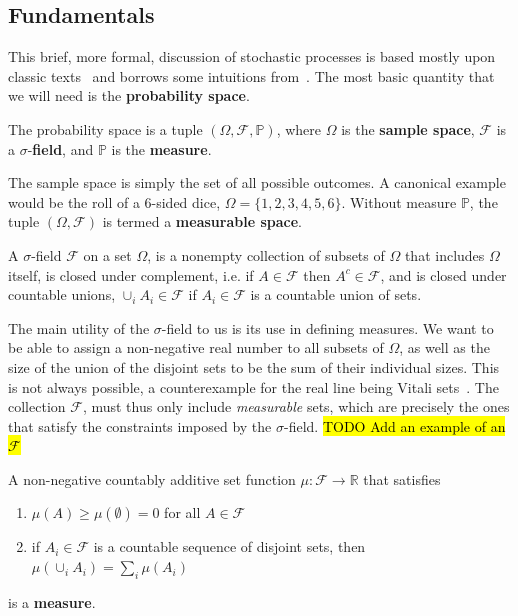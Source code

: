 \subsection{Fundamentals}
This brief, more formal, discussion of stochastic processes is based mostly upon classic texts~\cite{durrett2019probability, rogers1994diffusions, rogers2000diffusions} and borrows some intuitions from~\cite{sarkka2019applied}. The most basic quantity that we will need is the \textbf{probability space}. 
\begin{definition}
	The probability space is a tuple $(\Omega, \mathcal{F}, \mathbb{P})$, where $\Omega$ is the \textbf{sample space}, $\mathcal{F}$ is a $\sigma$-\textbf{field}, and $\mathbb{P}$ is the \textbf{measure}.
\end{definition}
The sample space is simply the set of all possible outcomes. A canonical example would be the roll of a 6-sided dice, $\Omega=\{1, 2, 3, 4, 5, 6\}$. Without measure $\mathbb{P}$, the tuple $(\Omega, \mathcal{F})$ is termed a \textbf{measurable space}.
\begin{definition}
	A $\sigma$-field $\mathcal{F}$ on a set $\Omega$, is a nonempty collection of subsets of $\Omega$ that includes $\Omega$ itself, is closed under complement, i.e. if $A \in \mathcal{F}$ then $A^c \in \mathcal{F}$, and is closed under countable unions, $\cup_{i} A_{i} \in \mathcal{F}$ if $A_{i} \in \mathcal{F}$ is a countable union of sets.
\end{definition}
The main utility of the $\sigma$-field to us is its use in defining measures. We want to be able to assign a non-negative real number to all subsets of $\Omega$, as well as the size of the union of the disjoint sets to be the sum of their individual sizes. This is not always possible, a counterexample for the real line being Vitali sets~\cite{}. The collection $\mathcal{F}$, must thus only include \emph{measurable} sets, which are precisely the ones that satisfy the constraints imposed by the $\sigma$-field. \hl{TODO Add an example of an $\mathcal{F}$}
\begin{definition}[Measure]
	A non-negative countably additive set function $\mu: \mathcal{F} \rightarrow \mathbb{R}$ that satisfies
	\begin{enumerate}[label=\roman*]
		\item $\mu(A) \geq \mu(\emptyset)=0$ for all $A \in \mathcal{F}$
		\item if $A_{i} \in \mathcal{F}$ is a countable sequence of disjoint sets, then $\mu\left(\cup_{i} A_{i}\right)=\sum_{i} \mu\left(A_{i}\right)$
	\end{enumerate}
	is a \textbf{measure}.
\end{definition}
